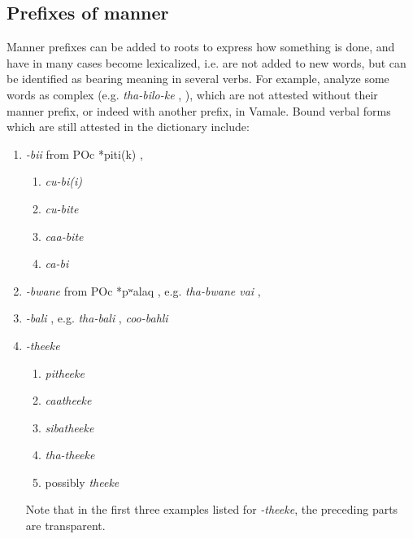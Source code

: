 \subsection{Prefixes of manner}
\label{sec:Manner}
Manner prefixes can be added to roots to express how something is done, and have in many cases become lexicalized, i.e. are not added to new words, but can be identified as bearing meaning in several verbs. %
For example, \citeauthor{rivierre_bwatoo_2006} analyze some words as complex (e.g. \textit{tha-bilo-ke} , \citeyear[61]{rivierre_bwatoo_2006}), which are not attested without their manner prefix, or indeed with another prefix, in Vamale. Bound verbal forms which are still attested in the dictionary include: 
\begin{enumerate}
	\item \textit{-bii}  from POc *piti(k)  \parencite[276]{ross_lexicon_1998},\begin{enumerate}
		\item  \textit{cu-bi(i)}  
		\item \textit{cu-bite} 
		\item \textit{caa-bite} 
		\item \textit{ca-bi} 
	\end{enumerate}
	\item \textit{-bwane}  from POc *pʷalaq  \parencite[265]{ross_lexicon_1998}, e.g. \textit{tha-bwane vai} , 
	\item \textit{-bali} , e.g. \textit{tha-bali} , \textit{coo-bahli} 
	\item \textit{-theeke} 
	\begin{enumerate}
	\item \textit{pitheeke} 
	\item \textit{caatheeke} 
	\item \textit{sibatheeke} 
	\item \textit{tha-theeke} 
	\item possibly \textit{theeke} 
	\end{enumerate}
Note that in the first three examples listed for \textit{-theeke}, the preceding parts are transparent.

\end{enumerate}
